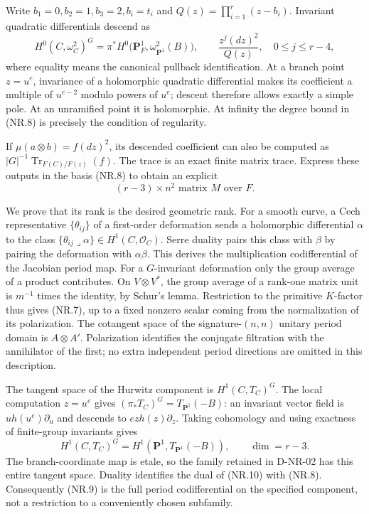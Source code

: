 Write $b_1=0,b_2=1,b_3=2,b_i=t_i$ and
$Q(z)=\prod_{i=1}^r(z-b_i)$.  Invariant quadratic differentials descend as
\[
 H^0(C,\omega_C^2)^G
  =\pi^*H^0\bigl(\mathbf P^1_F,\omega_{\mathbf P^1}^2(B)\bigr),
 \qquad
 \frac{z^j(dz)^2}{Q(z)},\quad0\le j\le r-4,                 \tag{NR.8}
\]
where equality means the canonical pullback identification.  At a branch
point $z=u^e$, invariance of a holomorphic quadratic differential makes
its coefficient a multiple of $u^{e-2}$ modulo powers of $u^e$; descent
therefore allows exactly a simple pole.  At an unramified point it is
holomorphic.  At infinity the degree bound in (NR.8) is precisely the
condition of regularity.

If $\mu(a\otimes b)=f(dz)^2$, its descended coefficient can also be
computed as $|G|^{-1}\operatorname{Tr}_{F(C)/F(z)}(f)$.
The trace is an exact finite matrix trace.  Express these outputs in the
basis (NR.8) to obtain an explicit
\[
                       (r-3)\times n^2\text{ matrix }M
                       \text{ over }F.                      \tag{NR.9}
\]

We prove that its rank is the desired geometric rank.  For a smooth curve,
a Cech representative $\{\theta_{ij}\}$ of a first-order deformation
sends a holomorphic differential $\alpha$ to the class
$\{\theta_{ij}\mathbin{\lrcorner}\alpha\}\in H^1(C,\mathcal O_C)$.
Serre duality pairs this class with $\beta$ by pairing the deformation
with $\alpha\beta$.  This derives the multiplication codifferential of
the Jacobian period map.  For a $G$-invariant deformation only the group
average of a product contributes.  On $V\otimes V^*$, the group average
of a rank-one matrix unit is $m^{-1}$ times the identity, by Schur's
lemma.  Restriction to the primitive $K$-factor thus gives (NR.7), up to
a fixed nonzero scalar coming from the normalization of its polarization.
The cotangent space of the signature-$(n,n)$ unitary period domain is
$A\otimes A'$.  Polarization identifies the conjugate filtration with
the annihilator of the first; no extra independent period directions are
omitted in this description.

The tangent space of the Hurwitz component is
$H^1(C,T_C)^G$.  The local computation $z=u^e$ gives
$(\pi_*T_C)^G=T_{\mathbf P^1}(-B)$: an invariant vector field is
$u h(u^e)\partial_u$ and descends to $e z h(z)\partial_z$.
Taking cohomology and using exactness of finite-group invariants gives
\[
 H^1(C,T_C)^G=H^1(\mathbf P^1,T_{\mathbf P^1}(-B)),
 \qquad \dim=r-3.                                           \tag{NR.10}
\]
The branch-coordinate map is etale, so the family retained in D-NR-02
has this entire tangent space.  Duality identifies the dual of (NR.10)
with (NR.8).  Consequently (NR.9) is the full period codifferential on
the specified component, not a restriction to a conveniently chosen
subfamily.


